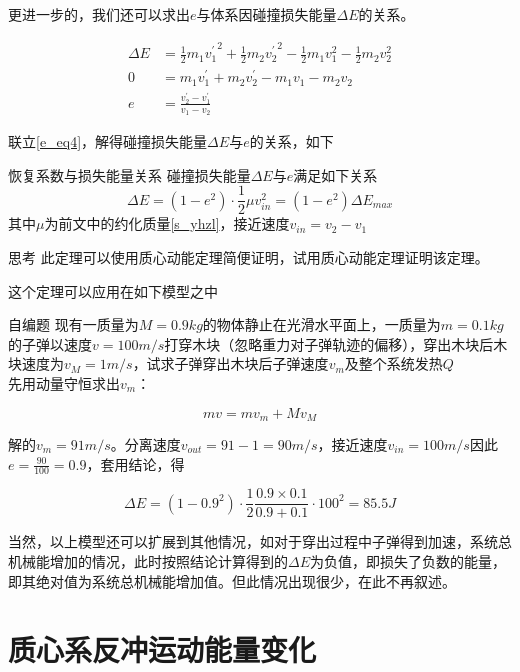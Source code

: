 更进一步的，我们还可以求出$e$与体系因碰撞损失能量$\Delta E$的关系。

\begin{subequations}
\label{e_eq4}
\begin{align}
\Delta E &= \frac{1}{2} m_1 {v_1^{\prime}}^2 + \frac{1}{2} m_2 {v_2^{\prime}}^2 - \frac{1}{2} m_1 v_1^2 - \frac{1}{2} m_2 v_2^2 \\
0 &= m_1 v_1^{\prime} + m_2 v_2^{\prime} - m_1 v_1 - m_2 v_2 \\
e &= \frac{v_2^{\prime} - v_1^{\prime}}{v_1 - v_2}
\end{align}
\end{subequations}

联立\eqref{e_eq4}，解得碰撞损失能量$\Delta E$与$e$的关系，如下

\begin{theo}{恢复系数与损失能量关系}{}
碰撞损失能量$\Delta E$与$e$满足如下关系
$$\Delta E = (1 - e^2) \cdot \frac{1}{2} \mu v_{in}^2 = (1 - e^2) \Delta E_{max}$$
其中$\mu$为前文中的约化质量\eqref{s_yhzl}，接近速度$v_{in} = v_2 - v_1$
\end{theo}

\begin{mk}{思考}{}
此定理可以使用质心动能定理简便证明，试用质心动能定理证明该定理。
\end{mk}

这个定理可以应用在如下模型之中

\begin{ep}{自编题}{}
现有一质量为$M=0.9kg$的物体静止在光滑水平面上，一质量为$m=0.1kg$的子弹以速度$v=100m/s$打穿木块（忽略重力对子弹轨迹的偏移），穿出木块后木块速度为$v_M = 1m/s$，试求子弹穿出木块后子弹速度$v_m$及整个系统发热$Q$
~\\

先用动量守恒求出$v_m$：

$$m v = m v_m + M v_M$$

解的$v_m = 91m/s$。分离速度$v_{out} =  91 - 1 = 90m/s$，接近速度$v_{in} = 100m/s$因此$e = \frac{90}{100} = 0.9$，套用结论，得

$$\Delta E = (1 - 0.9^2) \cdot \frac{1}{2} \frac{0.9 \times 0.1}{0.9 + 0.1} \cdot 100^2 = 85.5J$$
\end{ep}

当然，以上模型还可以扩展到其他情况，如对于穿出过程中子弹得到加速，系统总机械能增加的情况，此时按照结论计算得到的$\Delta E$为负值，即损失了负数的能量，即其绝对值为系统总机械能增加值。但此情况出现很少，在此不再叙述。

\section{质心系反冲运动能量变化}